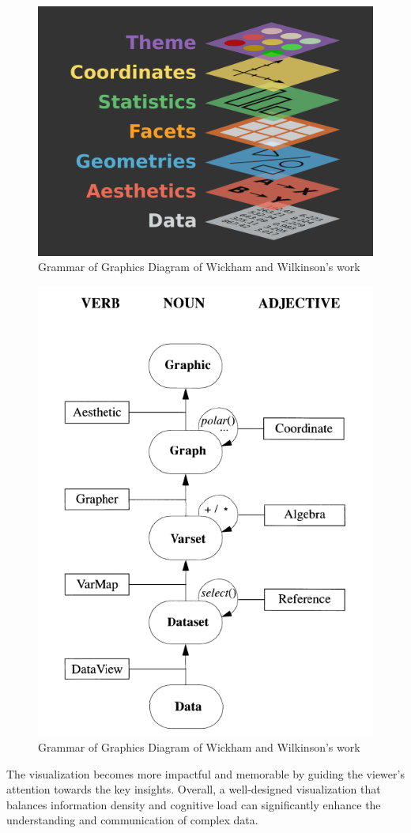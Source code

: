 \documentclass[print]{nuthesis}
\begin{document}
\begin{figure}

{\centering \includegraphics[width=0.45\linewidth]{figure/gglayers} 

}

\caption{Grammar of Graphics Diagram of Wickham and Wilkinson's work}\label{fig:unnamed-chunk-2-1}
\end{figure}
\begin{figure}

{\centering \includegraphics[width=0.45\linewidth]{figure/graphic-flowchart} 

}

\caption{Grammar of Graphics Diagram of Wickham and Wilkinson's work}\label{fig:unnamed-chunk-2-2}
\end{figure}

The visualization becomes more impactful and memorable by guiding the viewer's attention towards the key insights.
Overall, a well-designed visualization that balances information density and cognitive load can significantly enhance the understanding and communication of complex data.
\end{document}

